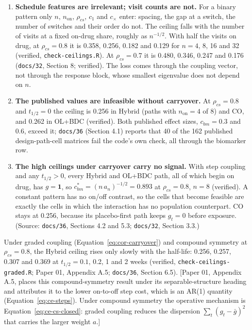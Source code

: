 \documentclass[11pt]{article}
\newcommand{\note}[1]{\textcolor{blue!60!black}{\small [#1]}}
\newcommand{\code}[1]{\texttt{#1}}
\begin{document}
\begin{enumerate}[itemsep=2pt]
\item \textbf{Schedule features are irrelevant; visit counts are
  not.} For a binary pattern only $n$, $n_{\mathrm{on}}$, $\rho_{cs}$,
  $c_1$ and $c_\times$ enter: spacing, the gap at a switch, the number
  of switches and their order do not. The ceiling falls with the
  number of visits at a fixed on-drug share, roughly as $n^{-1/2}$.
  With half the visits on drug, at $\rho_{cs} = 0.8$ it is 0.358, 0.256,
  0.182 and 0.129 for $n = 4$, 8, 16 and 32 (verified,
  \code{check-ceilings.R}). At $\rho_{cs} = 0.7$ it is 0.480, 0.346, 0.247
  and 0.176 (\code{docs/32}, Section 8; verified). The loss comes
  through the coupling vector, not through the response block, whose
  smallest eigenvalue does not depend on $n$.
\item \textbf{The published values are infeasible without carryover.}
  At $\rho_{cs} = 0.8$ and $t_{1/2} = 0$ the ceiling is 0.256 in Hybrid
  (paths with $n_{\mathrm{on}} = 4$ of 8) and CO, and 0.262 in OL+BDC
  (verified). Both published effect sizes, $c_{bm} = 0.3$ and 0.6,
  exceed it; \code{docs/36} (Section 4.1) reports that 40 of the 162
  published design-path-cell matrices fail the code's own check, all
  through the biomarker row.
\item \textbf{The high ceilings under carryover carry no signal.} With
  step coupling and any $t_{1/2} > 0$, every Hybrid and OL+BDC path,
  all of which begin on drug, has $g = \mathbf 1$, so
  $c_{bm}^{\ast} = (n\,a_n)^{-1/2} = 0.893$ at $\rho_{cs} = 0.8$, $n = 8$
  (verified). A constant pattern has no on/off contrast, so the cells
  that become feasible are exactly the cells in which the interaction
  has no population counterpart. CO stays at 0.256, because its
  placebo-first path keeps $g_t = 0$ before exposure. (Source:
  \code{docs/36}, Sections 4.2 and 5.3; \code{docs/32}, Section 3.3.)
\end{enumerate}

Under graded coupling (Equation~\eqref{eq:cor-carryover}) and compound
symmetry at $\rho_{cs} = 0.8$, the Hybrid ceiling rises only slowly with the
half-life: 0.256, 0.257, 0.307 and 0.369 at $t_{1/2} = 0.1$, 0.2, 1
and 2 weeks (verified, \code{check-ceilings-graded.R}; Paper 01, Appendix A.5;
\code{docs/36}, Section 6.5). \note{Paper 01, Appendix A.5, places this
compound-symmetry result under its separable-structure heading and
attributes it to the lower on-to-off step cost, which is an AR(1)
quantity (Equation~\eqref{eq:ce-steps}). Under compound symmetry the
operative mechanism is Equation~\eqref{eq:ce-cs-closed}: graded
coupling reduces the dispersion $\sum_t (g_t - \bar g)^2$ that carries
the larger weight $a$.}
\end{document}
